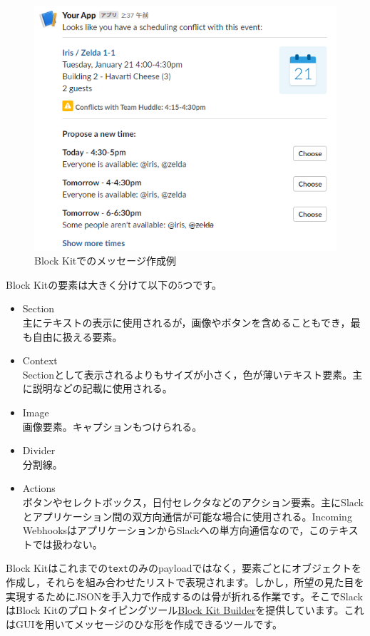 \documentclass[uplatex,a4j]{jsarticle}
\begin{document}
\begin{figure}[H]
 \centering
 \includegraphics[keepaspectratio, scale=0.7]{images/block_kit_example.png}
 \caption{Block Kitでのメッセージ作成例}
 \label{fig:block_kit_example}
\end{figure}

Block Kitの要素は大きく分けて以下の5つです。

\begin{itemize}
\item Section \\
主にテキストの表示に使用されるが，画像やボタンを含めることもでき，最も自由に扱える要素。
\item Context\\
Sectionとして表示されるよりもサイズが小さく，色が薄いテキスト要素。主に説明などの記載に使用される。
\item Image\\
画像要素。キャプションもつけられる。
\item Divider\\
分割線。
\item Actions\\
ボタンやセレクトボックス，日付セレクタなどのアクション要素。主にSlackとアプリケーション間の双方向通信が可能な場合に使用される。Incoming WebhooksはアプリケーションからSlackへの単方向通信なので，このテキストでは扱わない。
\end{itemize}

Block Kitはこれまでの\verb|text|のみのpayloadではなく，要素ごとにオブジェクトを作成し，それらを組み合わせたリストで表現されます。しかし，所望の見た目を実現するためにJSONを手入力で作成するのは骨が折れる作業です。そこでSlackはBlock Kitのプロトタイピングツール\href{https://api.slack.com/tools/block-kit-builder}{Block Kit Builder}を提供しています。これはGUIを用いてメッセージのひな形を作成できるツールです。
\end{document}
